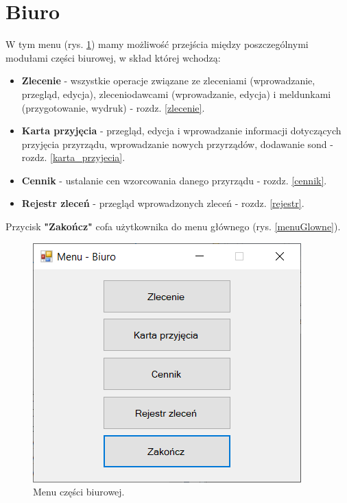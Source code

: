 
\rozdzial

\section{Biuro}
\label{biuro}

W tym menu (rys. \ref{menuBiuro}) mamy możliwość przejścia między poszczególnymi modułami części biurowej, w skład której wchodzą:
\begin{itemize}
	\item \textbf{Zlecenie} - wszystkie operacje związane ze zleceniami (wprowadzanie, przegląd, edycja), zleceniodawcami (wprowadzanie, edycja) i meldunkami (przygotowanie, wydruk) - rozdz. \ref{zlecenie}.
	\item \textbf{Karta przyjęcia} - przegląd, edycja i wprowadzanie informacji dotyczących przyjęcia przyrządu, wprowadzanie nowych przyrządów, dodawanie sond - rozdz. \ref{karta_przyjecia}.
	\item \textbf{Cennik} - ustalanie cen wzorcowania danego przyrządu - rozdz. \ref{cennik}.
	\item \textbf{Rejestr zleceń} - przegląd wprowadzonych zleceń - rozdz. \ref{rejestr}.
\end{itemize}

Przycisk \textbf{"Zakończ"} cofa użytkownika do menu głównego (rys. \ref{menuGlowne}).

\begin{figure}[htb]
	\centering
	\includegraphics{obrazki/Biuro/menu_biuro.png}
	\caption{Menu części biurowej.}
	\label{menuBiuro}
\end{figure}

